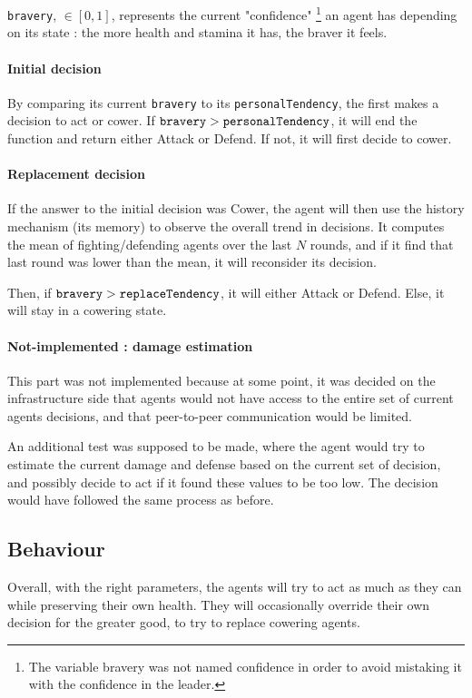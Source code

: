  \verb|bravery|, $\in [0,1]$, represents the current "confidence" \footnote{The variable bravery was not named confidence in order to avoid mistaking it with the confidence in the leader.} an agent has depending on its state : the more health and stamina it has, the braver it feels.

 \paragraph{Initial decision}

 By comparing its current \verb|bravery| to its \verb|personalTendency|, the first makes a decision to act or cower. If $\verb|bravery| > \verb|personalTendency|$, it will end the function and return either Attack or Defend. If not, it will first decide to cower.


 \paragraph{Replacement decision}

 If the answer to the initial decision was Cower, the agent will then use the history mechanism (its memory) to observe the overall trend in decisions. It computes the mean of fighting/defending agents over the last $N$ rounds, and if it find that last round was lower than the mean, it will reconsider its decision.

 Then, if  $\verb|bravery| > \verb|replaceTendency|$, it will either Attack or Defend. Else, it will stay in a cowering state.

\paragraph{Not-implemented : damage estimation}

This part was not implemented because at some point, it was decided on the infrastructure side that agents would not have access to the entire set of current agents decisions, and that peer-to-peer communication would be limited.

An additional test was supposed to be made, where the agent would try to estimate the current damage and defense based on the current set of decision, and possibly decide to act if it found these values to be too low. The decision would have followed the same process as before.

\subsection{Behaviour}
Overall, with the right parameters, the agents will try to act as much as they can while preserving their own health. They will occasionally override their own decision for the greater good, to try to replace cowering agents.


